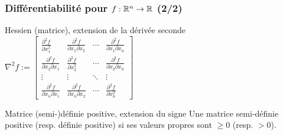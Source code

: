 \begin{frame}
  \frametitle{Différentiabilité pour $f: {\mathbb{R}}^n \rightarrow {\ensuremath\mathbb{R}}$ (2/2)}
  
  \begin{block}{Hessien (matrice), extension de la dérivée seconde}
    $\nabla^2 f :=
    \begin{bmatrix}{\frac {\partial ^{2}f}{\partial x_{1}^{2}}}&{\frac {\partial ^{2}f}{\partial x_{1}\partial x_{2}}}&\cdots &{\frac {\partial ^{2}f}{\partial x_{1}\partial x_{n}}}\\{\frac {\partial ^{2}f}{\partial x_{2}\partial x_{1}}}&{\frac {\partial ^{2}f}{\partial x_{2}^{2}}}&\cdots &{\frac {\partial ^{2}f}{\partial x_{2}\partial x_{n}}}\\\vdots &\vdots &\ddots &\vdots \\{\frac {\partial ^{2}f}{\partial x_{n}\partial x_{1}}}&{\frac {\partial ^{2}f}{\partial x_{n}\partial x_{2}}}&\cdots &{\frac {\partial ^{2}f}{\partial x_{n}^{2}}}\end{bmatrix}$
  \end{block}

  \begin{block}{Matrice (semi-)définie positive, extension du signe}
    Une matrice semi-définie positive (resp. définie positive) si 
    ses valeurs propres sont $\geq 0$ (resp. $> 0$).
  \end{block}

\end{frame}

